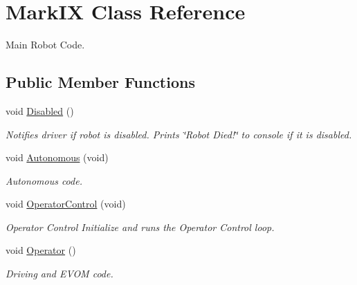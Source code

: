 \hypertarget{class_mark_i_x}{\section{Mark\-I\-X Class Reference}
\label{class_mark_i_x}
}


Main Robot Code.  


\subsection*{Public Member Functions}
\begin{DoxyCompactItemize}
\item 
\hypertarget{class_mark_i_x_adca4ea1bab73e885b019e8cf1a5707fe}{void \hyperlink{class_mark_i_x_adca4ea1bab73e885b019e8cf1a5707fe}{Disabled} ()}\label{class_mark_i_x_adca4ea1bab73e885b019e8cf1a5707fe}

\begin{DoxyCompactList}\small\item\em Notifies driver if robot is disabled. Prints \char`\"{}\-Robot Died!\char`\"{} to console if it is disabled. \end{DoxyCompactList}\item 
\hypertarget{class_mark_i_x_aea97f16722f64241e523e413011bd814}{void \hyperlink{class_mark_i_x_aea97f16722f64241e523e413011bd814}{Autonomous} (void)}\label{class_mark_i_x_aea97f16722f64241e523e413011bd814}

\begin{DoxyCompactList}\small\item\em Autonomous code. \end{DoxyCompactList}\item 
void \hyperlink{class_mark_i_x_a8ddc43e1aab8dac7ca737f929507e22b}{Operator\-Control} (void)
\begin{DoxyCompactList}\small\item\em Operator Control Initialize and runs the Operator Control loop. \end{DoxyCompactList}\item 
\hypertarget{class_mark_i_x_aaaebc36ed027d8bc5f0a6f655be57879}{void \hyperlink{class_mark_i_x_aaaebc36ed027d8bc5f0a6f655be57879}{Operator} ()}\label{class_mark_i_x_aaaebc36ed027d8bc5f0a6f655be57879}

\begin{DoxyCompactList}\small\item\em Driving and E\-V\-O\-M code. \end{DoxyCompactList}\end{DoxyCompactItemize}


